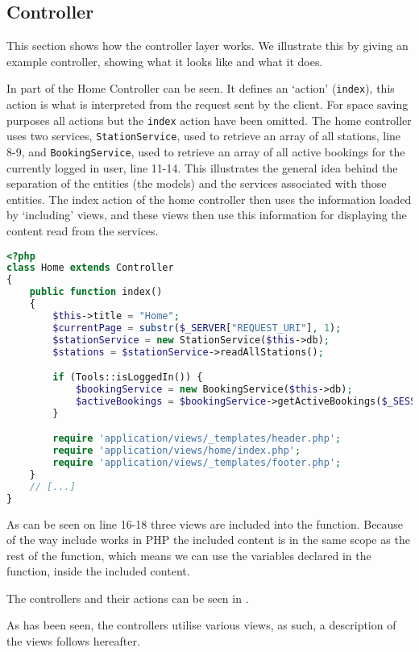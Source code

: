 \subsection{Controller}
This section shows how the controller layer works. 
We illustrate this by giving an example controller, showing what it looks like and what it does.

In  part of the Home Controller can be seen. 
It defines an `action' (\texttt{index}), this action is what is interpreted from the request sent by the client. 
For space saving purposes all actions but the \texttt{index} action have been omitted.
The home controller uses two services, \texttt{StationService}, used to retrieve an array of all stations, line 8-9, and \texttt{BookingService}, used to retrieve an array of all active bookings for the currently logged in user, line 11-14. 
This illustrates the general idea behind the separation of the entities (the models) and the services associated with those entities.
The index action of the home controller then uses the information loaded by `including' views, and these views then use this information for displaying the content read from the services.

\begin{lstlisting}[language=php, label=lst:homeController, caption={Home Controller Class.}]
<?php
class Home extends Controller
{
    public function index()
    {
        $this->title = "Home";
        $currentPage = substr($_SERVER["REQUEST_URI"], 1);
        $stationService = new StationService($this->db);
        $stations = $stationService->readAllStations();

        if (Tools::isLoggedIn()) {
            $bookingService = new BookingService($this->db);
            $activeBookings = $bookingService->getActiveBookings($_SESSION["login_user"]);
        }

        require 'application/views/_templates/header.php';
        require 'application/views/home/index.php';
        require 'application/views/_templates/footer.php';
    }
    // [...]
}
\end{lstlisting}

As can be seen on line 16-18 three views are included into the function. Because of the way include works in PHP the included content is in the same scope as the rest of the function, which means we can use the variables declared in the function, inside the included content.

The controllers and their actions can be seen in .

As has been seen, the controllers utilise various views, as such, a description of the views follows hereafter.
